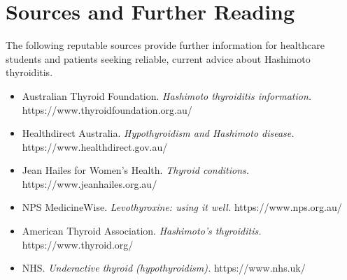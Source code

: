 \section*{Sources and Further Reading}
The following reputable sources provide further information for healthcare students and patients seeking reliable, current advice about Hashimoto thyroiditis.

\begin{itemize}
    \item Australian Thyroid Foundation. \textit{Hashimoto thyroiditis information.} https://www.thyroidfoundation.org.au/
    \item Healthdirect Australia. \textit{Hypothyroidism and Hashimoto disease.} https://www.healthdirect.gov.au/
    \item Jean Hailes for Women's Health. \textit{Thyroid conditions.} https://www.jeanhailes.org.au/
    \item NPS MedicineWise. \textit{Levothyroxine: using it well.} https://www.nps.org.au/
    \item American Thyroid Association. \textit{Hashimoto's thyroiditis.} https://www.thyroid.org/
    \item NHS. \textit{Underactive thyroid (hypothyroidism).} https://www.nhs.uk/
\end{itemize}
